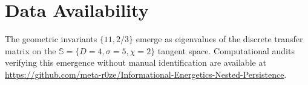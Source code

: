 \section{Data Availability}

The geometric invariants $\{11, 2/3\}$ emerge as eigenvalues of the discrete transfer matrix on the $\mathbb{S}=\{D=4,\sigma=5,\chi=2\}$ tangent space. Computational audits verifying this emergence without manual identification are available at \url{https://github.com/meta-r0ze/Informational-Energetics-Nested-Persistence}.